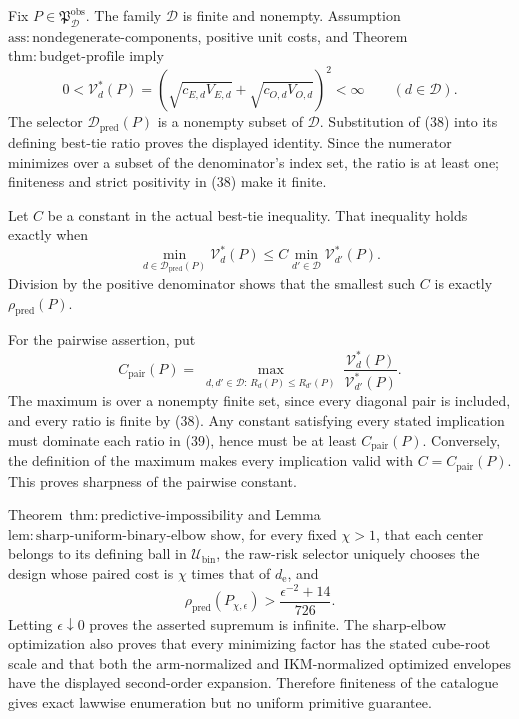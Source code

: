 Fix \(P\in\mathfrak P_{\mathcal D}^{\mathrm{obs}}\).  The family \(\mathcal D\) is finite and nonempty.  Assumption~\(\mathrm{ass{:}nondegenerate\text{-}components}\), positive unit costs, and Theorem~\(\mathrm{thm{:}budget\text{-}profile}\) imply
\[
 0<\mathcal V_d^*(P)
 =\left(\sqrt{c_{E,d}V_{E,d}}+
 \sqrt{c_{O,d}V_{O,d}}\right)^2<\infty
 \qquad(d\in\mathcal D).                                \tag{38}
\]
The selector \(\mathcal D_{\mathrm{pred}}(P)\) is a nonempty subset of \(\mathcal D\).  Substitution of (38) into its defining best-tie ratio proves the displayed identity.  Since the numerator minimizes over a subset of the denominator's index set, the ratio is at least one; finiteness and strict positivity in (38) make it finite.

Let \(C\) be a constant in the actual best-tie inequality.  That inequality holds exactly when
\[
 \min_{d\in\mathcal D_{\mathrm{pred}}(P)}\mathcal V_d^*(P)
 \le C\min_{d'\in\mathcal D}\mathcal V_{d'}^*(P).
\]
Division by the positive denominator shows that the smallest such \(C\) is exactly \(\rho_{\mathrm{pred}}(P)\).

For the pairwise assertion, put
\[
 C_{\mathrm{pair}}(P)=
 \max_{\substack{d,d'\in\mathcal D:\,
 R_d(P)\le R_{d'}(P)}}
 \frac{\mathcal V_d^*(P)}{\mathcal V_{d'}^*(P)}.          \tag{39}
\]
The maximum is over a nonempty finite set, since every diagonal pair is included, and every ratio is finite by (38).  Any constant satisfying every stated implication must dominate each ratio in (39), hence must be at least \(C_{\mathrm{pair}}(P)\).  Conversely, the definition of the maximum makes every implication valid with \(C=C_{\mathrm{pair}}(P)\).  This proves sharpness of the pairwise constant.

Theorem~\(\mathrm{thm{:}predictive\text{-}impossibility}\) and Lemma~\(\mathrm{lem{:}sharp\text{-}uniform\text{-}binary\text{-}elbow}\) show, for every fixed \(\chi>1\), that each center belongs to its defining ball in \(\mathcal U_{\mathrm{bin}}\), the raw-risk selector uniquely chooses the design whose paired cost is \(\chi\) times that of \(d_{\mathrm e}\), and
\[
 \rho_{\mathrm{pred}}(P_{\chi,\epsilon})
 >\frac{\epsilon^{-2}+14}{726}.
\]
Letting \(\epsilon\downarrow0\) proves the asserted supremum is infinite.  The sharp-elbow optimization also proves that every minimizing factor has the stated cube-root scale and that both the arm-normalized and IKM-normalized optimized envelopes have the displayed second-order expansion.  Therefore finiteness of the catalogue gives exact lawwise enumeration but no uniform primitive guarantee.
